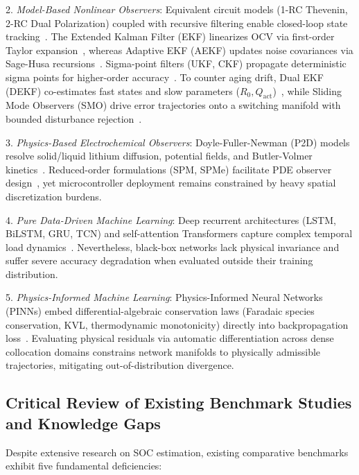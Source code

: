 \documentclass[balance,nocopyright,upint,varvw,hyphenate,barcolor=NavyBlue,nolists]{asmejour}
\begin{document}
2. \emph{Model-Based Nonlinear Observers}: Equivalent circuit models (1-RC Thevenin, 2-RC Dual Polarization) coupled with recursive filtering enable closed-loop state tracking~\cite{He2011ecm,Hu2012ecm}. The Extended Kalman Filter (EKF) linearizes OCV via first-order Taylor expansion~\cite{Plett2004part3,Santhanagopalan2006jes}, whereas Adaptive EKF (AEKF) updates noise covariances via Sage-Husa recursions~\cite{Han2019aekf,Wang2021tcn}. Sigma-point filters (UKF, CKF) propagate deterministic sigma points for higher-order accuracy~\cite{Plett2006ukf,He2013ukf,Peng2021ackf}. To counter aging drift, Dual EKF (DEKF) co-estimates fast states and slow parameters ($R_0, Q_{\text{act}}$)~\cite{Charkhgard2010dekf,Yang2024degradation}, while Sliding Mode Observers (SMO) drive error trajectories onto a switching manifold with bounded disturbance rejection~\cite{Kim2011,Chen2016smo,Feng2019smo}.

3. \emph{Physics-Based Electrochemical Observers}: Doyle-Fuller-Newman (P2D) models resolve solid/liquid lithium diffusion, potential fields, and Butler-Volmer kinetics~\cite{Doyle1993,Torchio2016pybam,Northrop2014p2d}. Reduced-order formulations (SPM, SPMe) facilitate PDE observer design~\cite{DiDomenico2010spm,Moura2017pde,Marquis2019spme}, yet microcontroller deployment remains constrained by heavy spatial discretization burdens.

4. \emph{Pure Data-Driven Machine Learning}: Deep recurrent architectures (LSTM, BiLSTM, GRU, TCN) and self-attention Transformers capture complex temporal load dynamics~\cite{Hansen2005svr,Chemali2018dnn,Liu2020gpr,Song2019bilstm,Jiao2020attn,Wang2021tcn,Vaswani2017attention,Shen2023transformer}. Nevertheless, black-box networks lack physical invariance and suffer severe accuracy degradation when evaluated outside their training distribution.

5. \emph{Physics-Informed Machine Learning}: Physics-Informed Neural Networks (PINNs) embed differential-algebraic conservation laws (Faradaic species conservation, KVL, thermodynamic monotonicity) directly into backpropagation loss~\cite{Raissi2019pinn,Brancato2026,Li2023nature}. Evaluating physical residuals via automatic differentiation across dense collocation domains constrains network manifolds to physically admissible trajectories, mitigating out-of-distribution divergence.

\subsection{Critical Review of Existing Benchmark Studies and Knowledge Gaps}
Despite extensive research on SOC estimation, existing comparative benchmarks exhibit five fundamental deficiencies:
\end{document}
